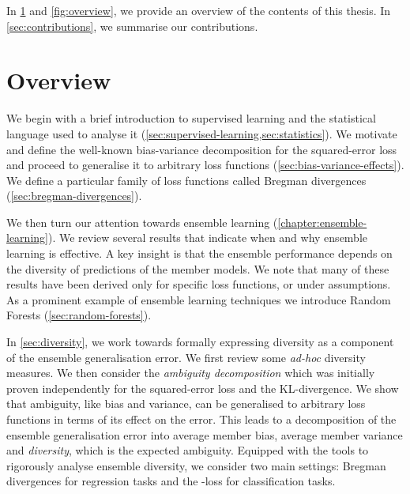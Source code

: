 \documentclass[
	twoside=false, %
]{kaobook}
\begin{document}
In \cref{sec:overview} and \cref{fig:overview}, we provide an overview of the contents of this thesis. In \cref{sec:contributions}, we summarise our contributions.



\section{Overview}
\label{sec:overview}

We begin with a brief introduction to supervised learning and the statistical language used to analyse it
(\cf \cref{sec:supervised-learning,sec:statistics}). We motivate and define the well-known bias-variance decomposition for the squared-error loss and proceed to generalise it to arbitrary loss functions
(\cf \cref{sec:bias-variance-effects}).  
We define a particular family of loss functions called Bregman divergences
(\cf \cref{sec:bregman-divergences}).

We then turn our attention towards ensemble learning (\cf \cref{chapter:ensemble-learning}). We review several results that indicate when and why ensemble learning is effective. A key insight is that the ensemble performance depends on the diversity of predictions of the member models. We note that many of these results have been derived only for specific loss functions, or under assumptions. As a prominent example of ensemble learning techniques we introduce Random Forests (\cf \cref{sec:random-forests}).

In \cref{sec:diversity}, we work towards formally expressing diversity as a component of the ensemble generalisation error. We first review some \textit{ad-hoc} diversity measures. We then consider the \textit{ambiguity decomposition} which was initially proven independently for the squared-error loss and the KL-divergence. We show that ambiguity, like bias and variance, can be generalised to arbitrary loss functions in terms of its effect on the error. This leads to a decomposition of the ensemble generalisation error into average member bias, average member variance and \textit{diversity}, which is the expected ambiguity. Equipped with the tools to rigorously analyse ensemble diversity, we consider two main settings: Bregman divergences for regression tasks and the \zeroone-loss for classification tasks. 
\end{document}
